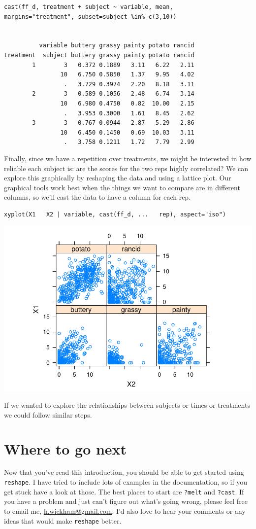\documentclass[]{article}
\begin{document}
\begin{verbatim}
cast(ff_d, treatment + subject ~ variable, mean, 
margins="treatment", subset=subject %in% c(3,10))

                                                      
          variable buttery grassy painty potato rancid
treatment  subject buttery grassy painty potato rancid
        1        3   0.372 0.1889   3.11   6.22   2.11
                10   6.750 0.5850   1.37   9.95   4.02
                 .   3.729 0.3974   2.20   8.18   3.11
        2        3   0.589 0.1056   2.48   6.74   3.14
                10   6.980 0.4750   0.82  10.00   2.15
                 .   3.953 0.3000   1.61   8.45   2.62
        3        3   0.767 0.0944   2.87   5.29   2.86
                10   6.450 0.1450   0.69  10.03   3.11
                 .   3.758 0.1211   1.72   7.79   2.99
\end{verbatim}

Finally, since we have a repetition over treatments, we might be interested in how reliable each subject is: are the scores for the two reps highly correlated?  We can explore this graphically by reshaping the data and using a lattice plot.  Our graphical tools work best when the things we want to compare are in different columns, so we'll cast the data to have a column for each rep.

\texttt{xyplot(X1 ~ X2 | variable, cast(ff\_d, ... ~ rep), aspect="iso")}

\includegraphics{.introductionw.wcache/1doig.pdf}

If we wanted to explore the relationships between subjects or times or treatments we could follow similar steps.

\section{Where to go next}

Now that you've read this introduction, you should be able to get started using \texttt{reshape}.  I have tried to include lots of examples in the documentation, so if you get stuck have a look at those.  The best places to start are \texttt{?melt} and \texttt{?cast}.  If you have a problem and just can't figure out what's going wrong, please feel free to email me, \href{mailto:h.wickham@gmail.com}{h.wickham@gmail.com}.  I'd also love to hear your comments or any ideas that would make \texttt{reshape} better.
\end{document}
